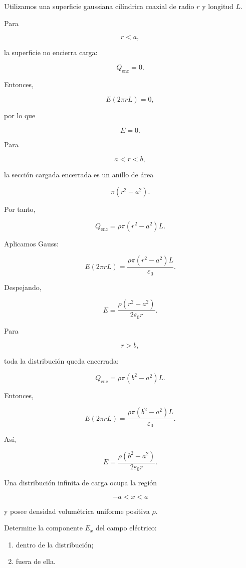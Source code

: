 \begin{explicacion}

Utilizamos una superficie gaussiana cilíndrica coaxial de radio \(r\) y longitud
\(L\).

Para

\[
r<a,
\]

la superficie no encierra carga:

\[
Q_{\text{enc}}=0.
\]

Entonces,

\[
E(2\pi rL)=0,
\]

por lo que

\[
\boxed{E=0}.
\]

Para

\[
a<r<b,
\]

la sección cargada encerrada es un anillo de área

\[
\pi(r^2-a^2).
\]

Por tanto,

\[
Q_{\text{enc}}
=
\rho\pi(r^2-a^2)L.
\]

Aplicamos Gauss:

\[
E(2\pi rL)
=
\frac{\rho\pi(r^2-a^2)L}{\varepsilon_0}.
\]

Despejando,

\[
\boxed{
E=
\frac{\rho(r^2-a^2)}{2\varepsilon_0r}
}.
\]

Para

\[
r>b,
\]

toda la distribución queda encerrada:

\[
Q_{\text{enc}}
=
\rho\pi(b^2-a^2)L.
\]

Entonces,

\[
E(2\pi rL)
=
\frac{\rho\pi(b^2-a^2)L}{\varepsilon_0}.
\]

Así,

\[
\boxed{
E=
\frac{\rho(b^2-a^2)}{2\varepsilon_0r}
}.
\]

\end{explicacion}


\begin{ejercicio}

Una distribución infinita de carga ocupa la región

\[
-a<x<a
\]

y posee densidad volumétrica uniforme positiva \(\rho\).

Determine la componente \(E_x\) del campo eléctrico:

\begin{enumerate}
    \item dentro de la distribución;
    \item fuera de ella.
\end{enumerate}

\end{ejercicio}

